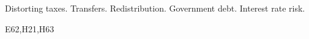 \documentclass[thmsb,11pt]{article}
\begin{document}
%


%

\bigskip
{}Distorting taxes. Transfers. Redistribution.  Government debt.  Interest rate risk.

 E62,H21,H63
\thispagestyle{empty}\bigskip
\end{document}
